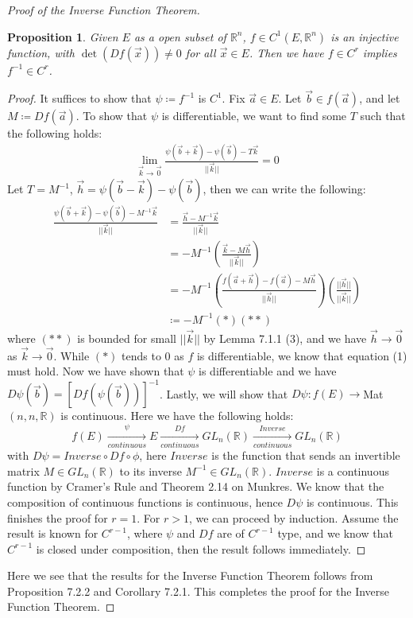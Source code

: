 \documentclass[11pt,oneside]{book}
\theoremstyle{break}
\theoremstyle{break}
\newtheorem{prop}[lem]{Proposition}
\newcommand{\R}{\mathbb{R}}
\begin{document}
\begin{proof}[Proof of the Inverse Function Theorem]
\begin{prop}
\setlength{\leftskip}{1cm} Given $E$ as a open subset of $\R^n$, $f \in C^1(E,\R^n)$ is an injective function, with $\det(Df(\vec{x})) \neq 0$ for all $\vec{x}\in E$. Then we have $f \in C^r$ implies $f^{-1} \in C^r$. 
\end{prop}
\begin{proof}
\setlength{\leftskip}{1cm}It suffices to show that $\psi \coloneqq f^{-1}$ is $C^1$. Fix $\vec{a}\in E$. Let $\vec{b} \in f(\vec{a})$, and let $M\coloneqq Df(\vec{a})$. To show that $\psi$ is differentiable, we want to find some $T$ such that the following holds:
\begin{align*}\lim_{\vec{k}\to \vec{0}}\frac{\psi(\vec{b}+\vec{k})-\psi(\vec{b}) - T\vec{k}}{||\vec{k}||} = 0 \tag{1}
\end{align*}
Let $T = M^{-1}$, $\vec{h}= \psi(\vec{b}-\vec{k})-\psi(\vec{b})$, then we can write the following:
\begin{align*}
\frac{\psi(\vec{b}+\vec{k})-\psi(\vec{b}) - M^{-1}\vec{k}}{||\vec{k}||} &= \frac{\vec{h}-M^{-1}\vec{k}}{||\vec{k}||}\\ &= -M^{-1}\left(\frac{\vec{k}-M\vec{h}}{||\vec{k}||}  \right)\\
&= -M^{-1} \left(\frac{f(\vec{a}+\vec{h}) - f(\vec{a}) - M\vec{h}}{||\vec{h}||}  \right)\left(\frac{||\vec{h}||}{||\vec{k}||} \right) \\
&\coloneqq -M^{-1} (*)(**)
\end{align*}
where $(**)$ is bounded for small $||\vec{k}||$ by Lemma 7.1.1 (3), and we have $\vec{h}\to \vec{0}$ as $\vec{k}\to \vec{0}$. While $(*)$ tends to $0$ as $f$ is differentiable, we know that equation (1) must hold. Now we have shown that $\psi$ is differentiable and we have $D\psi(\vec{b}) = [Df(\psi(\vec{b}))]^{-1}$. Lastly, we will show that $D\psi: f(E) \to $Mat$(n,n,\R)$ is continuous. Here we have the following holds:
$$f(E)\xrightarrow[continuous]{\psi}E\xrightarrow[continuous]{Df}GL_{n}(\R) \xrightarrow[continuous]{Inverse}GL_{n}(\R)$$
with $D\psi = Inverse \circ Df \circ \phi$, here $Inverse$ is the function that sends an invertible matrix $M\in GL_{n}(\R)$ to its inverse $M^{-1}\in GL_{n}(\R)$. $Inverse$ is a continuous function by Cramer's Rule and Theorem 2.14 on Munkres. We know that the composition of continuous functions is continuous, hence $D\psi$ is continuous. This finishes the proof for $r=1$. For $r>1$, we can proceed by induction. Assume the result is known for $C^{r-1}$, where $\psi$ and $Df$ are of $C^{r-1}$ type, and we know that $C^{r-1}$ is closed under composition, then the result follows immediately. 
\end{proof}

Here we see that the results for the Inverse Function Theorem follows from Proposition 7.2.2 and Corollary 7.2.1. This completes the proof for the Inverse Function Theorem. \end{proof}
\hfill\break\hfill\break
\end{document}
